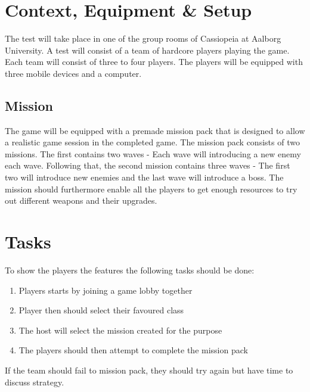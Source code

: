 \section{Context, Equipment \& Setup}
The test will take place in one of the group rooms of Cassiopeia at Aalborg University.
A test will consist of a team of hardcore players playing the game.
Each team will consist of three to four players.
The players will be equipped with three mobile devices and a computer.

\subsection{Mission}
The game will be equipped with a premade mission pack that is designed to allow a realistic game session in the completed game.
The mission pack consists of two missions.
The first contains two waves - Each wave will introducing a new enemy each wave.
Following that, the second mission contains three waves - The first two will introduce new enemies and the last wave will introduce a boss.
The mission should furthermore enable all the players to get enough resources to try out different weapons and their upgrades.

\section{Tasks}
To show the players the features the following tasks should be done:
\begin{enumerate}
	\item Players starts by joining a game lobby together
	\item Player then should select their favoured class
	\item The host will select the mission created for the purpose
	\item The players should then attempt to complete the mission pack
\end{enumerate}
If the team should fail to mission pack, they should try again but have time to discuss strategy.

